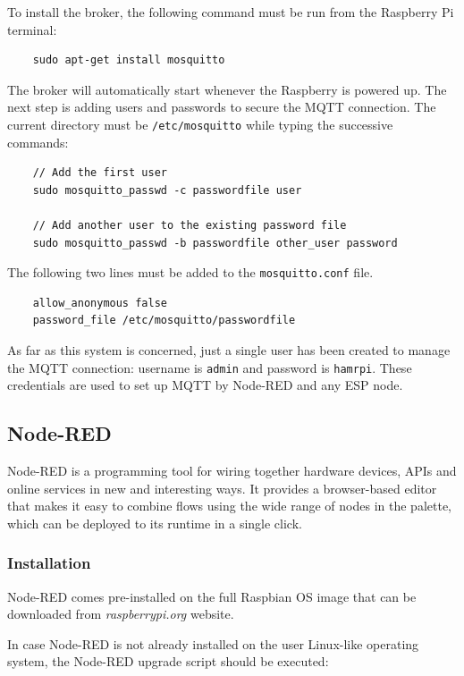 To install the broker, the following command must be run from the Raspberry Pi terminal:

\begin{verbatim}
    sudo apt-get install mosquitto
\end{verbatim}

\noindent
The broker will automatically start whenever the Raspberry is powered up. The next step is adding users and passwords to secure the MQTT connection. The current directory must be \texttt{/etc/mosquitto} while typing the successive commands:

\begin{verbatim}
    // Add the first user
    sudo mosquitto_passwd -c passwordfile user
    
    // Add another user to the existing password file
    sudo mosquitto_passwd -b passwordfile other_user password
\end{verbatim}

\noindent
The following two lines must be added to the \texttt{mosquitto.conf} file.

\begin{verbatim}
    allow_anonymous false
    password_file /etc/mosquitto/passwordfile
\end{verbatim}

\noindent
As far as this system is concerned, just a single user has been created to manage the MQTT connection: username is \texttt{admin} and password is \texttt{hamrpi}. These credentials are used to set up MQTT by Node-RED and any ESP node.

\subsection{Node-RED}
Node-RED is a programming tool for wiring together hardware devices, APIs and online services in new and interesting ways.
It provides a browser-based editor that makes it easy to combine flows using the wide range of nodes in the palette, which can be deployed to its runtime in a single click.

\subsubsection{Installation}
Node-RED comes pre-installed on the full Raspbian OS image that can be downloaded from \textit{raspberrypi.org} website.

In case Node-RED is not already installed on the user Linux-like operating system, the Node-RED upgrade script should be executed:

